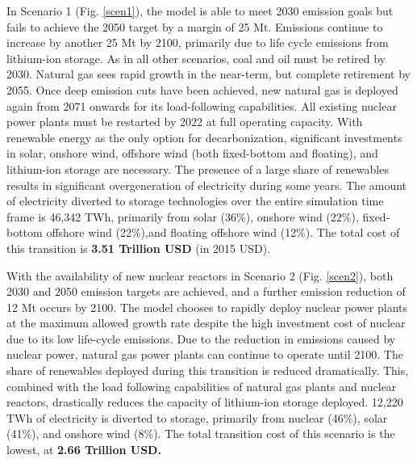 In Scenario 1 (Fig. \ref{scen1}), the model is able to meet 2030 emission goals but fails to achieve the 2050 target by a margin of 25 Mt. Emissions continue to increase by another 25 Mt by 2100, primarily due to life cycle emissions from lithium-ion storage. As in all other scenarios, coal and oil must be retired by 2030. Natural gas sees rapid growth in the near-term, but complete retirement by 2055. Once deep emission cuts have been achieved, new natural gas is deployed again from 2071 onwards for its load-following capabilities. All existing nuclear power plants must be restarted by 2022 at full operating capacity. With renewable energy as the only option for decarbonization, significant investments in solar, onshore wind, offshore wind (both fixed-bottom and floating), and lithium-ion storage are necessary. The presence of a large share of renewables results in significant overgeneration of electricity during some years. The amount of electricity diverted to storage technologies over the entire simulation time frame is 46,342 TWh, primarily from solar (36\%), onshore wind (22\%), fixed-bottom offshore wind (22\%),and floating offshore wind (12\%). The total cost of this transition is \textbf{3.51 Trillion USD} (in 2015 USD).

With the availability of new nuclear reactors in Scenario 2 (Fig. \ref{scen2}), both 2030 and 2050 emission targets are achieved, and a further emission reduction of 12 Mt occurs by 2100. The model chooses to rapidly deploy nuclear power plants at the maximum allowed growth rate despite the high investment cost of nuclear due to its low life-cycle emissions. Due to the reduction in emissions caused by nuclear power, natural gas power plants can continue to operate until 2100. The share of renewables deployed during this transition is reduced dramatically. This, combined with the load following capabilities of natural gas plants and nuclear reactors, drastically reduces the capacity of lithium-ion storage deployed. 12,220 TWh of electricity is diverted to storage, primarily from nuclear (46\%), solar (41\%), and onshore wind (8\%). The total transition cost of this scenario is the lowest, at \textbf{2.66 Trillion USD.}

